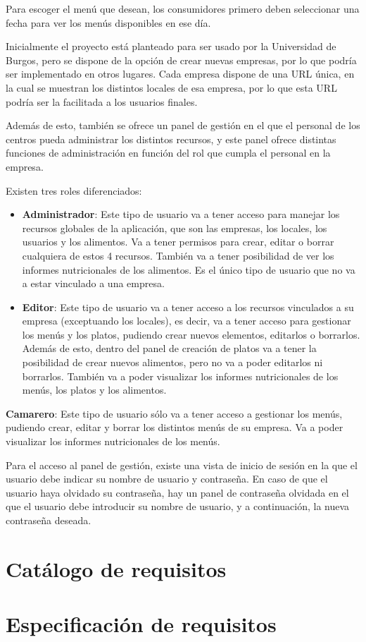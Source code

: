 Para escoger el menú que desean, los consumidores primero deben seleccionar una fecha para ver los menús disponibles en ese día.

Inicialmente el proyecto está planteado para ser usado por la Universidad de Burgos, pero se dispone de la opción de crear nuevas empresas, por lo que podría ser implementado en otros lugares. Cada empresa dispone de una URL única, en la cual se muestran los distintos locales de esa empresa, por lo que esta URL podría ser la facilitada a los usuarios finales.

Además de esto, también se ofrece un panel de gestión en el que el personal de los centros pueda administrar los distintos recursos, y este panel ofrece distintas funciones de administración en función del rol que cumpla el personal en la empresa.

Existen tres roles diferenciados:

\begin{itemize}
	\item \textbf{Administrador}: Este tipo de usuario va a tener acceso para manejar los recursos globales de la aplicación, que son las empresas, los locales, los usuarios y los alimentos. Va a tener permisos para crear, editar o borrar cualquiera de estos 4 recursos. También va a tener posibilidad de ver los informes nutricionales de los alimentos. Es el único tipo de usuario que no va a estar vinculado a una empresa. 
	\item \textbf{Editor}: Este tipo de usuario va a tener acceso a los recursos vinculados a su empresa (exceptuando los locales), es decir, va a tener acceso para gestionar los menús y los platos, pudiendo crear nuevos elementos, editarlos o borrarlos. Además de esto, dentro del panel de creación de platos va a tener la posibilidad de crear nuevos alimentos, pero no va a poder editarlos ni borrarlos. También va a poder visualizar los informes nutricionales de los menús, los platos y los alimentos.
\end{itemize} \textbf{Camarero}: Este tipo de usuario sólo va a tener acceso a gestionar los menús, pudiendo crear, editar y borrar los distintos menús de su empresa. Va a poder visualizar los informes nutricionales de los menús.

Para el acceso al panel de gestión, existe una vista de inicio de sesión en la que el usuario debe indicar su nombre de usuario y contraseña. En caso de que el usuario haya olvidado su contraseña, hay un panel de contraseña olvidada en el que el usuario debe introducir su nombre de usuario, y a continuación, la nueva contraseña deseada.


\section{Catálogo de requisitos}


\section{Especificación de requisitos}



